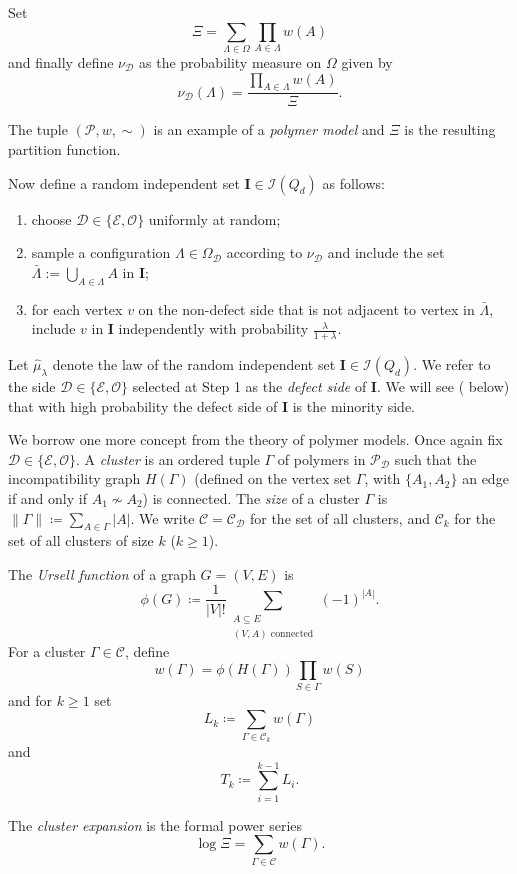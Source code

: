 \documentclass[a4paper]{amsart}
\theoremstyle{definition}
\newcommand{\cO}{\mathcal{O} }
\newcommand{\cC}{\mathcal{C} }
\newcommand{\cD}{\mathcal{D} }
\newcommand{\cE}{\mathcal{E} }
\newcommand{\cI}{\mathcal{I} }
\newcommand{\cP}{\mathcal{P} }
\newcommand{\nin}[0]{\noindent}
\newcommand{\0}[0]{\emptyset}
\newcommand{\lam}{\lambda}
\begin{document}
Set
\[\Xi=\sum_{\Lambda\in\Omega} \prod_{A\in \Lambda} w(A)\]
and finally define $\nu_\cD$ as the probability measure on $\Omega$ given by
\[ \nu_\cD (\Lambda)=\frac{\prod_{A\in\Lambda} w(A)}{\Xi}.\]

\nin The tuple $(\cP, w, \sim)$ is an example of a \emph{polymer model} and $\Xi$ is the resulting partition function.

Now define a random independent set $\mathbf{ I}\in\cI(Q_d)$ as follows:
\begin{enumerate}
    \item choose $\cD\in\{\cE,\cO\}$ uniformly at random;\label{Step1}
    \item sample a configuration $\Lambda\in\Omega_\cD$ according to $\nu_\cD$ and include the set $\bar\Lambda:=\bigcup_{A\in\Lambda}A$ in $\mathbf{I}$;\label{Step2}
    \item for each vertex $v$ on the non-defect side that is not adjacent to  vertex in $\bar\Lambda$, include $v$ in $\mathbf{I}$ independently with probability $\frac{\lam}{1+\lam}$.\label{Step3}
\end{enumerate}
Let $\hat{\mu}_\lam$ denote the law of the random independent set $\mathbf{I}\in\cI(Q_d)$. We refer to the side $\cD\in\{\cE,\cO\}$ selected at Step 1 as the \emph{defect side} of $\mathbf{I}$. We will see ( below) that with high probability the defect side of $\mathbf{I}$ is the minority side. 

We borrow one more concept from the theory of  polymer models. Once again fix $\cD\in\{\cE,\cO\}$. A \emph{cluster} is an ordered tuple $\Gamma$ of polymers in $\cP_\cD$ such that the incompatibility graph $H(\Gamma)$ (defined on the vertex set $\Gamma$, with $\{A_1,A_2\}$ an edge if and only if $A_1\not\sim A_2$) is connected. The \emph{size} of a cluster $\Gamma$ is $\|\Gamma\|\coloneqq \sum_{A\in\Gamma} |A|$. We write $\cC=\cC_\cD$ for the set of all clusters, and $\cC_k$ for the set of all clusters of size $k$ ($k\geq 1$).

The \emph{Ursell function} of a graph $G=(V,E)$ is
\[ \phi(G)\coloneqq \frac{1}{|V|!} \sum_{\substack{A\subseteq E \\ (V,A)\text{ connected}}} (-1)^{|A|}.  \]
For a cluster $\Gamma\in\cC$, define
\[ w(\Gamma)=\phi(H(\Gamma))\prod_{S\in\Gamma} w(S)\]
and for $k\geq 1$  set
\[ L_k\coloneqq \sum_{\Gamma\in\cC_k} w(\Gamma)\]
and
\[ T_k\coloneqq \sum_{i=1}^{k-1} L_i.\]

The \emph{cluster expansion} is the formal power series
\[ \log \Xi = \sum_{\Gamma\in \cC} w(\Gamma).\]
\end{document}
